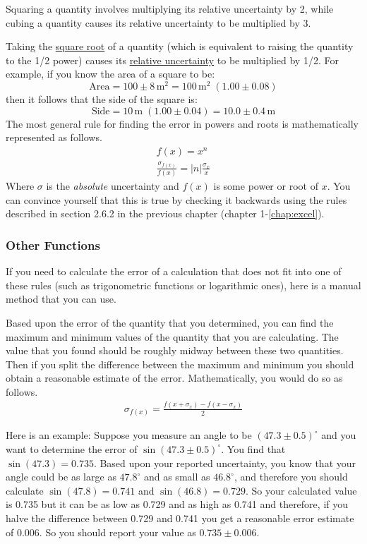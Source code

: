 Squaring a quantity involves multiplying its relative uncertainty by 2, while cubing a quantity causes its relative uncertainty to be multiplied by 3.\myskip

Taking the \underline{square root} of a quantity (which is equivalent to raising the quantity to the 1/2 power) causes its \underline{relative uncertainty} to be multiplied by 1/2. For example, if you know the area of a square to be: 
\begin{equation}
    \text{Area} = 100\pm 8\,\mathrm{m^2} = 100\,\mathrm{m}^2\;(1.00\pm 0.08)
\end{equation}
then it follows that the side of the square is:
\begin{equation}
    \text{Side} = 10\,\mathrm{m}\;\left( 1.00\pm 0.04 \right) = 10.0\pm 0.4\,\mathrm{m}
\end{equation}
The most general rule for finding the error in powers and roots is mathematically represented as follows.
\begin{gather}
f(x) = x^n \\
\frac{\sigma_{f(x)}}{f(x)} = |n| \frac{\sigma_x}{x}
\end{gather}
Where $\sigma$ is the {\it{absolute}} uncertainty and $f(x)$ is some power or root of $x$.
You can convince yourself that this is true by checking it backwards using the rules described in section 2.6.2 in the previous chapter (chapter 1-\ref{chap:excel}).

\subsubsection{Other Functions}

If you need to calculate the error of a calculation that does not fit into one of these rules (such as trigonometric functions or logarithmic ones), here is a manual method that you can use.\myskip

Based upon the error of the quantity that you determined, you can find the maximum and minimum values of the quantity that you are calculating. The value that you found should be roughly midway between these two quantities. Then if you split the difference between the maximum and minimum you should obtain a reasonable estimate of the error. Mathematically, you would do so as follows.
\begin{gather}
\sigma_{f(x)} = \frac{f(x + \sigma_x) - f(x - \sigma_x)}{2}
\end{gather}

Here is an example: Suppose you measure an angle to be $(47.3 \pm 0.5)^\circ$ and you want to determine the error of $\sin(47.3 \pm 0.5)^\circ$. You find that $\sin(47.3) = 0.735$. Based upon your reported uncertainty, you know that your angle could be as large as $47.8^\circ$ and as small as $46.8^\circ$, and therefore you should calculate $\sin(47.8) = 0.741$ and $\sin(46.8) = 0.729$. So your calculated value is 0.735 but it can be as low as 0.729 and as high as 0.741 and therefore, if you halve the difference between 0.729 and 0.741 you get a reasonable error estimate of 0.006. So you should report your value as $0.735 \pm 0.006$.

